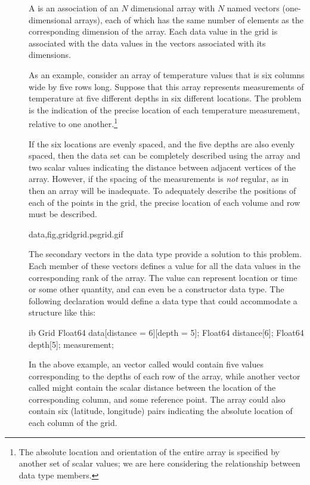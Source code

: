 \begin{description}
\item []  A  is an association of
  an $N$ dimensional array with $N$ named vectors (one-dimensional
  arrays), each of which has the same number of elements as the
  corresponding dimension of the array.  Each data value in the grid
  is associated with the data values in the vectors associated with
  its dimensions.   
  
  As an example, consider an array of temperature values that is six
  columns wide by five rows long. Suppose that this array represents
  measurements of temperature at five different depths in six
  different locations. The problem is the indication of the precise
  location of each temperature measurement, relative to one
  another.\footnote{The absolute location and orientation of the
    entire array is specified by another set of scalar values; we are
    here considering the relationship between data type members.}
  
  If the six locations are evenly spaced, and the five depths are also
  evenly spaced, then the data set can be completely described using
  the array and two scalar values indicating the distance between
  adjacent vertices of the array. However, if the spacing of the
  measurements is \emph{not} regular, as in 
  then an array will be inadequate.  To adequately describe the
  positions of each of the points in the grid, the precise location of
  each volume and row must be described.

{data,fig,grid}{grid.ps}{grid.gif}{}

  The secondary
vectors in the  data type provide a solution to this
problem. Each member of these vectors defines a value for all the data
values in the corresponding rank of the array. The value can represent
location or time or some other quantity, and can even be a constructor
data type.  The following declaration would define a data type that
could accommodate a structure like this:

\begin{vcode}{ib}
   Grid {
      Float64 data[distance = 6][depth = 5];
      Float64 distance[6];
      Float64 depth[5];
   } measurement;
\end{vcode}

In the above example, an vector called  would contain five
values corresponding to the depths of each row of the array, while
another vector called  might contain the scalar distance
between the location of the corresponding column, and some reference
point. The  array could also contain six (latitude,
longitude) pairs indicating the absolute location of each column of
the grid.


\end{description}
